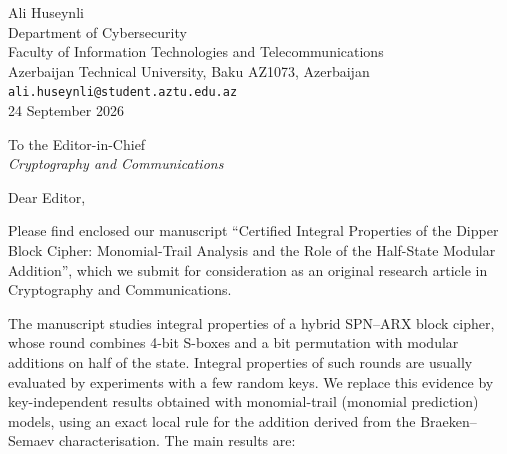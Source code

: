 \documentclass[10pt,a4paper]{article}
\begin{document}
\begin{flushright}
Ali Huseynli\\
Department of Cybersecurity\\
Faculty of Information Technologies and Telecommunications\\
Azerbaijan Technical University, Baku AZ1073, Azerbaijan\\
\texttt{ali.huseynli@student.aztu.edu.az}\\[6pt]
24 September 2026
\end{flushright}

To the Editor-in-Chief\\
\emph{Cryptography and Communications}

Dear Editor,

Please find enclosed our manuscript ``Certified Integral Properties of the Dipper Block Cipher: Monomial-Trail Analysis and the Role of the Half-State Modular Addition'', which we submit for consideration as an original research article in Cryptography and Communications.

The manuscript studies integral properties of a hybrid SPN--ARX block cipher, whose round combines 4-bit S-boxes and a bit permutation with modular additions on half of the state. Integral properties of such rounds are usually evaluated by experiments with a few random keys. We replace this evidence by key-independent results obtained with monomial-trail (monomial prediction) models, using an exact local rule for the addition derived from the Braeken--Semaev characterisation. The main results are:
\end{document}
